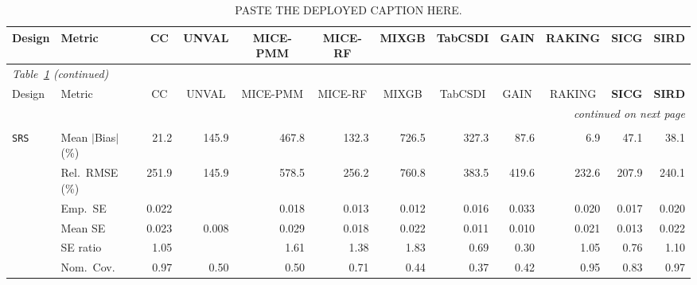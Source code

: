 \begin{landscape}
\footnotesize\setlength{\tabcolsep}{3.5pt}
\begin{longtable}{llrrrrrrrrrr}
\caption{PASTE THE DEPLOYED CAPTION HERE.}
\label{tab:appc_vccc_LOGISTIC} \\
\toprule
Design & Metric & \multicolumn{1}{c}{CC} & \multicolumn{1}{c}{UNVAL} & \multicolumn{1}{c}{MICE-PMM} & \multicolumn{1}{c}{MICE-RF} & \multicolumn{1}{c}{MIXGB} & \multicolumn{1}{c}{TabCSDI} & \multicolumn{1}{c}{GAIN} & \multicolumn{1}{c}{RAKING} & \multicolumn{1}{c}{\textbf{SICG}} & \multicolumn{1}{c}{\textbf{SIRD}} \\
\midrule \endfirsthead
\multicolumn{12}{l}{\footnotesize\itshape Table~\ref{tab:appc_vccc_LOGISTIC} (continued)} \\
\toprule
Design & Metric & \multicolumn{1}{c}{CC} & \multicolumn{1}{c}{UNVAL} & \multicolumn{1}{c}{MICE-PMM} & \multicolumn{1}{c}{MICE-RF} & \multicolumn{1}{c}{MIXGB} & \multicolumn{1}{c}{TabCSDI} & \multicolumn{1}{c}{GAIN} & \multicolumn{1}{c}{RAKING} & \multicolumn{1}{c}{\textbf{SICG}} & \multicolumn{1}{c}{\textbf{SIRD}} \\
\midrule \endhead
\midrule \multicolumn{12}{r}{\footnotesize\itshape continued on next page} \\
\endfoot
\bottomrule \endlastfoot
\multicolumn{12}{l}{\textbf{Continuous Phase-Two Covariates}} \\
\addlinespace[2pt]
\quad \texttt{SRS} & Mean $|$Bias$|$ (\%) & \cellcolor{ranktwo}21.2 & 145.9 & 467.8 & 132.3 & 726.5 & 327.3 & 87.6 & \cellcolor{rankone}6.9 & 47.1 & \cellcolor{rankthree}38.1 \\
 & Rel.\ RMSE (\%) & 251.9 & \cellcolor{rankone}145.9 & 578.5 & 256.2 & 760.8 & 383.5 & 419.6 & \cellcolor{rankthree}232.6 & \cellcolor{ranktwo}207.9 & 240.1 \\
 & Emp.\ SE & 0.022 &  & 0.018 & 0.013 & 0.012 & 0.016 & 0.033 & 0.020 & 0.017 & 0.020 \\
 & Mean SE & 0.023 & 0.008 & 0.029 & 0.018 & 0.022 & 0.011 & 0.010 & 0.021 & 0.013 & 0.022 \\
 & SE ratio & \cellcolor{rankone}1.05 &  & 1.61 & 1.38 & 1.83 & 0.69 & 0.30 & \cellcolor{ranktwo}1.05 & 0.76 & \cellcolor{rankthree}1.10 \\
 & Nom.\ Cov. & \cellcolor{rankthree}0.97 & 0.50 & 0.50 & 0.71 & 0.44 & 0.37 & 0.42 & \cellcolor{rankone}0.95 & 0.83 & \cellcolor{ranktwo}0.97 \\

\end{longtable}
\end{landscape}
